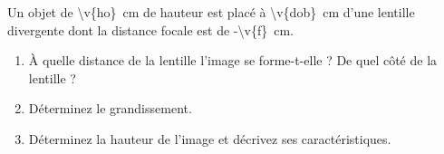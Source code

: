 Un objet de \qty{\v{ho}}{cm} de hauteur est placé à \qty{\v{dob}}{cm} d'une lentille divergente dont la distance focale est de \qty{-\v{f}}{cm}.

\begin{enumerate}[label=\alph*)]
    \item À quelle distance de la lentille l'image se forme-t-elle ? De quel côté de la lentille ?
    \item Déterminez le grandissement.
    \item Déterminez la hauteur de l'image et décrivez ses caractéristiques.
\end{enumerate}
